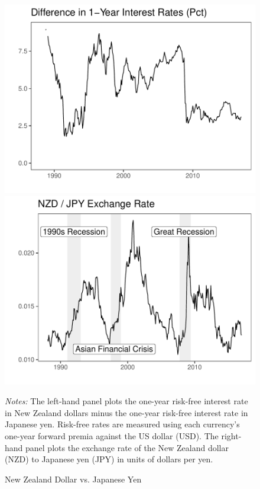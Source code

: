 \documentclass{ar-1col}
\begin{document}
\begin{figure}[htp!]
  \centering
  \caption{New Zealand Dollar vs. Japanese Yen}
  \label{fig:fp}
  \label{fig:spot}
  \begin{minipage}[htp]{0.49\textwidth}
  \includegraphics[width=\textwidth]{Exhibits/Figure_FP12M_DiffJPYNZD.pdf}
  \end{minipage}
  \begin{minipage}[htp]{0.49\textwidth}
  \includegraphics[width=\textwidth]{Exhibits/Figure_FX_JPYNZD.pdf}
  \end{minipage}
  
  \vspace{-1em}
  \begin{minipage}[htp]{\textwidth}
  \scriptsize
  \emph{Notes:} The left-hand panel plots the one-year risk-free interest rate in New Zealand dollars minus the one-year risk-free interest rate in Japanese yen. Risk-free rates are measured using each currency's one-year forward premia against the US dollar (USD). The right-hand panel plots the exchange rate of the New Zealand dollar (NZD) to Japanese yen (JPY) in units of dollars per yen. 
  \end{minipage}
\end{figure}
\end{document}
